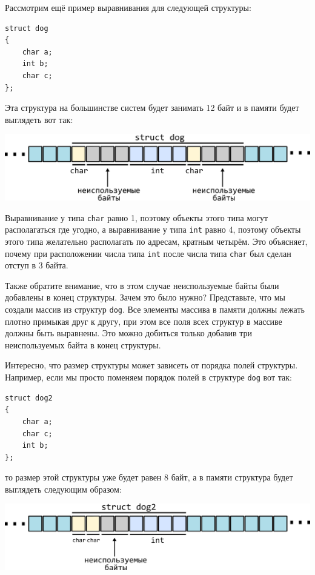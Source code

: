 \documentclass[10pt]{article}
\begin{document}
\newpage
Рассмотрим ещё пример выравнивания для следующей структуры:
\begin{lstlisting}
struct dog 
{
    char a;
    int b;
    char c;
};
\end{lstlisting}
Эта структура на большинстве систем будет занимать 12 байт и в памяти будет выглядеть вот так:
\begin{center}
\includegraphics[scale=1]{../images/alignment2.png}
\end{center}

Выравнивание у типа \texttt{char} равно 1, поэтому объекты этого типа могут располагаться где угодно, а выравнивание у типа \texttt{int} равно 4, поэтому объекты этого типа желательно располагать по адресам, кратным четырём. Это объясняет, почему при расположении числа типа \texttt{int} после числа типа \texttt{char} был сделан отступ в 3 байта.

Также обратите внимание, что в этом случае неиспользуемые байты были добавлены в конец структуры. Зачем это было нужно? Представьте, что мы создали массив из структур \texttt{dog}. Все элементы массива в памяти должны лежать плотно примыкая друг к другу, при этом все поля всех структур в массиве должны быть выравнены. Это можно добиться только добавив три неиспользуемых байта в конец структуры.

Интересно, что размер структуры может зависеть от порядка полей структуры. Например, если мы просто поменяем порядок полей в структуре \texttt{dog} вот так:
\begin{lstlisting}
struct dog2 
{
    char a;
    char c;
    int b;
};
\end{lstlisting}
то размер этой структуры уже будет равен 8 байт, а в памяти структура будет выглядеть следующим образом:
\begin{center}
\includegraphics[scale=1]{../images/alignment3.png}
\end{center}
\end{document}
